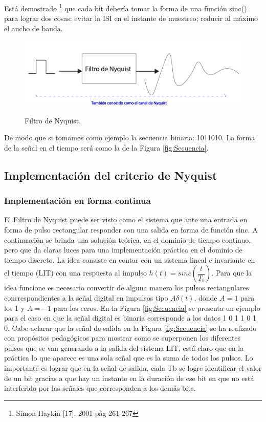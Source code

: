 Está demostrado \footnote{Simon Haykin [17], 2001 pág 261-267} que cada bit debería tomar la forma de una función sinc() para lograr dos cosas: evitar la ISI en el instante de muestreo; reducir al máximo el ancho de banda. \\

\begin{figure}[h!]
	\captionsetup{justification = raggedright, singlelinecheck = false}
	\caption{Filtro de Nyquist.} 
	\centering
	\includegraphics[scale=0.4]{Imagenes/Canal.png}
	\label{fig:Canal}
\end{figure}

De modo que si tomamos como ejemplo la secuencia binaria: 1011010. La forma de la señal en el tiempo será como la de la Figura \ref{fig:Secuencia}.\\

\subsection{Implementación del criterio de Nyquist}
\subsubsection{Implementación en forma continua}
El Filtro de Nyquist puede ser visto como el sistema que ante una entrada en forma de pulso rectangular responder con una salida en forma de función sinc. A continuación se brinda una solución teórica, en el dominio de tiempo continuo, pero que da claras luces para una implementación práctica en el dominio de tiempo discreto. La idea consiste en contar con un sistema lineal e invariante en el tiempo (LIT) con una respuesta al impulso $h(t) = sinc(\dfrac{t}{T_{b}})$. Para que la idea funcione es necesario convertir de alguna manera los pulsos rectangulares conrrespondientes a la señal digital en impulsos tipo $A \delta (t)$, donde $A=1$ para los 1 y $A=-1$ para los ceros. En la Figura  \ref{fig:Secuencia} se presenta un ejemplo para el caso en que la señal digital es binaria corresponde a los datos 1 0 1 1 0 1 0. Cabe aclarar que la señal de salida en la Figura  \ref{fig:Secuencia} se ha realizado con propósitos pedagógicos para mostrar como se superponen los diferentes pulsos que se van generando a la salida del sistema LIT, está claro que en la práctica lo que aparece es una sola señal que es la suma de todos los pulsos. Lo importante es lograr que en la señal de salida, cada Tb se logre identificar el valor de un bit gracias a que hay un instante en la duración de ese bit en que no está interferido por las señales que corresponden a los demás bits.\\

